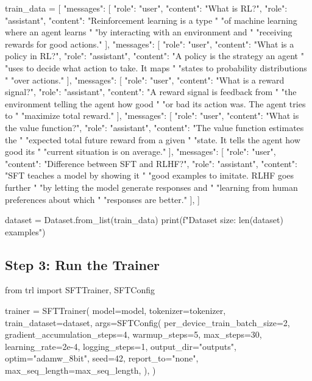 \begin{chapterenv}
\begin{codeblock}[python]
train_data = [
    {"messages": [
        {"role": "user",
         "content": "What is RL?"},
        {"role": "assistant",
         "content": "Reinforcement learning is a type "
         "of machine learning where an agent learns "
         "by interacting with an environment and "
         "receiving rewards for good actions."}
    ]},
    {"messages": [
        {"role": "user",
         "content": "What is a policy in RL?"},
        {"role": "assistant",
         "content": "A policy is the strategy an agent "
         "uses to decide what action to take. It maps "
         "states to probability distributions "
         "over actions."}
    ]},
    {"messages": [
        {"role": "user",
         "content": "What is a reward signal?"},
        {"role": "assistant",
         "content": "A reward signal is feedback from "
         "the environment telling the agent how good "
         "or bad its action was. The agent tries to "
         "maximize total reward."}
    ]},
    {"messages": [
        {"role": "user",
         "content": "What is the value function?"},
        {"role": "assistant",
         "content": "The value function estimates the "
         "expected total future reward from a given "
         "state. It tells the agent how good its "
         "current situation is on average."}
    ]},
    {"messages": [
        {"role": "user",
         "content": "Difference between SFT and RLHF?"},
        {"role": "assistant",
         "content": "SFT teaches a model by showing it "
         "good examples to imitate. RLHF goes further "
         "by letting the model generate responses and "
         "learning from human preferences about which "
         "responses are better."}
    ]},
]

dataset = Dataset.from_list(train_data)
print(f"Dataset size: {len(dataset)} examples")
\end{codeblock}

\subsection{Step 3: Run the Trainer}

\begin{codeblock}[python]
from trl import SFTTrainer, SFTConfig

trainer = SFTTrainer(
    model=model,
    tokenizer=tokenizer,
    train_dataset=dataset,
    args=SFTConfig(
        per_device_train_batch_size=2,
        gradient_accumulation_steps=4,
        warmup_steps=5,
        max_steps=30,
        learning_rate=2e-4,
        logging_steps=1,
        output_dir="outputs",
        optim="adamw_8bit",
        seed=42,
        report_to="none",
        max_seq_length=max_seq_length,
    ),
)


\end{codeblock}
\end{chapterenv}
